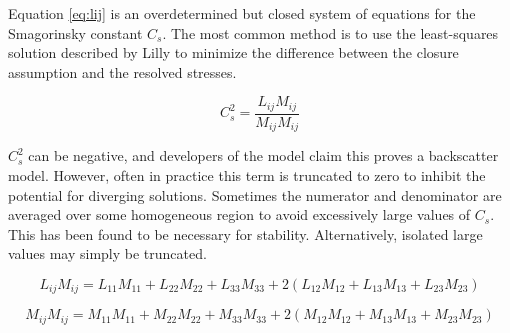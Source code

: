 \documentclass[12pt,titlepage]{article}
\begin{document}
Equation \ref{eq:lij} is an overdetermined but closed system of equations for the 
Smagorinsky constant $C_s$. The most common method is to use the
least-squares solution described by Lilly to minimize the difference
between the closure assumption and the resolved stresses.

\begin{displaymath}
C_s^2=\frac{L_{ij}M_{ij}}{M_{ij}M_{ij}}
\end{displaymath}

$C_s^2$ can be negative, and developers of the model
claim this proves a backscatter model. However, often in practice this term is
truncated to zero to inhibit the potential for diverging solutions. Sometimes the
numerator and denominator are averaged over some homogeneous region to avoid
excessively large values of $C_s$. This has been found to be necessary for stability.
Alternatively, isolated large values may simply be truncated.

\begin{displaymath}
L_{ij}M_{ij}=L_{11}M_{11}+L_{22}M_{22}+L_{33}M_{33}+2(L_{12}M_{12}+L_{13}M_{13}+L_{23}M_{23})
\end{displaymath}

\begin{displaymath}
M_{ij}M_{ij}=M_{11}M_{11}+M_{22}M_{22}+M_{33}M_{33}+2(M_{12}M_{12}+M_{13}M_{13}+M_{23}M_{23})
\end{displaymath}
\end{document}
